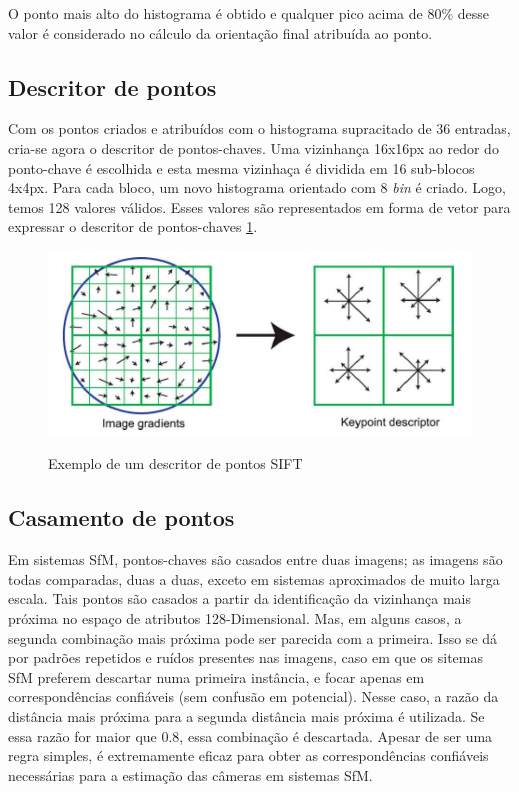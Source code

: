O ponto mais alto do histograma é obtido e qualquer pico acima de 80\% desse
valor é considerado no cálculo da orientação final atribuída ao ponto. 

\subsection{Descritor de pontos}

Com os pontos criados e atribuídos com o histograma 
supracitado de 36 entradas, cria-se agora o descritor de pontos-chaves.
Uma vizinhança 16x16px ao redor do ponto-chave é escolhida e esta mesma vizinhaça
é dividida em 16 sub-blocos 4x4px. Para cada bloco, um novo histograma orientado com 8
\emph{bin} é criado. Logo, temos 128 valores válidos. Esses valores são
representados em forma de vetor para expressar o descritor de pontos-chaves
\ref{fig:descritorkeypoint}.  

\begin{figure} [!h]
	\centering
	\caption{Exemplo de um descritor de pontos SIFT}
	\includegraphics[width=0.45\linewidth]{figs/descritorkeypoint.png}
	\label{fig:descritorkeypoint}
\end{figure}

\subsection{Casamento de pontos}

Em sistemas SfM, pontos-chaves são casados entre duas imagens; as imagens são
todas comparadas, duas a duas, exceto em sistemas aproximados de muito larga escala.
Tais pontos são casados a partir da identificação da
vizinhança mais próxima no espaço de atributos 128-Dimensional. Mas, em alguns
casos, a segunda combinação mais próxima pode ser parecida com a primeira. Isso
se dá por padrões repetidos e ruídos presentes nas imagens, caso em que os
sitemas SfM preferem descartar numa primeira instância, e focar apenas em
correspondências confiáveis (sem confusão em potencial).  Nesse caso, a razão da distância
mais próxima para a segunda distância mais próxima é utilizada. Se essa razão
for maior que 0.8, essa combinação é descartada. Apesar de ser uma regra
simples, é extremamente eficaz para obter as correspondências confiáveis
necessárias para a estimação das câmeras em sistemas SfM.

